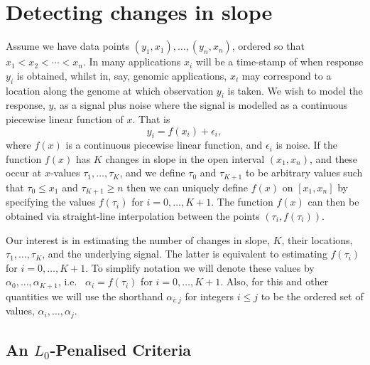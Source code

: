 \documentclass[nojss]{jss}
\begin{document}
%
%



\section[Background]{Detecting changes in slope} \label{sec:background}

Assume we have data points $(y_1,x_1),\ldots,(y_n,x_n)$, ordered so that $x_1<x_2<\cdots<x_n$. In many applications $x_i$ will be a time-stamp of when response $y_i$ is obtained, whilst in, say, genomic applications, $x_i$ may correspond to a location along the genome at which observation $y_i$ is taken. We wish to model the response, $y$, as a signal plus noise where the signal is modelled as a continuous piecewise linear function of $x$. That is
\begin{equation} \label{eq:cinslope}
y_i=f(x_i)+\epsilon_i,
\end{equation}
where $f(x)$ is a continuous piecewise linear function, and $\epsilon_i$ is noise. If the function $f(x)$ has $K$ changes in slope in the open interval $(x_1,x_n)$, and these occur at $x$-values $\tau_1,\ldots,\tau_K$, and we define $\tau_0$ and $\tau_{K+1}$ to be arbitrary values such that $\tau_0\leq x_1$ and $\tau_{K+1}\geq n$ then we can uniquely define $f(x)$ on $[x_1,x_n]$ by specifying the values $f(\tau_i)$ for $i=0,\ldots,K+1$. The function $f(x)$ can then be obtained via straight-line interpolation between the points $(\tau_i,f(\tau_i))$.

Our interest is in estimating the number of changes in slope, $K$, their locations, $\tau_1,\ldots,\tau_K$, and the underlying signal. The latter is equivalent to estimating $f(\tau_i)$ for $i=0,\ldots,K+1$. To simplify notation we will denote these values by $\alpha_0,\ldots,\alpha_{K+1}$, i.e.~ $\alpha_i=f(\tau_i)$ for $i=0,\ldots,K+1$. Also, for this and other quantities we will use the shorthand $\alpha_{i:j}$ for integers $i\leq j$ to be the ordered set of values, $\alpha_i,\ldots,\alpha_j$.

\subsection{An $L_0$-Penalised Criteria}
\end{document}
